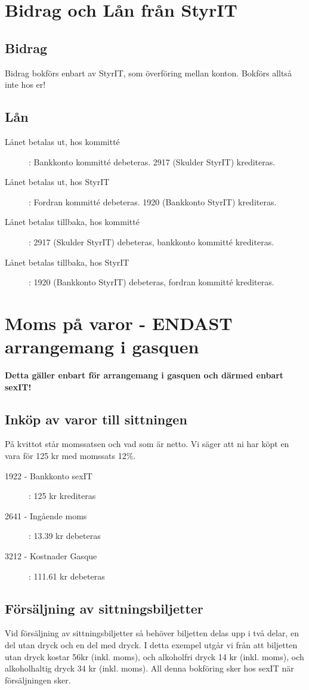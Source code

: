 \documentclass{article}
\begin{document}
\section{Bidrag och Lån från StyrIT}
\subsection{Bidrag}
Bidrag bokförs enbart av StyrIT, som överföring mellan konton. Bokförs alltså inte hos er! 
\subsection{Lån}
\begin{description}
    \item [Lånet betalas ut, hos kommitté]: Bankkonto kommitté debeteras. 2917 (Skulder StyrIT) krediteras. 
    \item [Lånet betalas ut, hos StyrIT]: Fordran kommitté debeteras. 1920 (Bankkonto StyrIT) krediteras.
    \item [Lånet betalas tillbaka, hos kommitté]: 2917 (Skulder StyrIT) debeteras, bankkonto kommitté krediteras.
    \item [Lånet betalas tillbaka, hos StyrIT]: 1920 (Bankkonto StyrIT) debeteras, fordran kommitté krediteras.
\end{description}

\section{Moms på varor - ENDAST arrangemang i gasquen}
\textbf{Detta gäller enbart för arrangemang i gasquen och därmed enbart sexIT!}
\subsection{Inköp av varor till sittningen}
På kvittot står momssatsen och vad som är netto. Vi säger att ni har köpt en vara för 125 kr med momssats 12\%. 
\begin{description}
    \item [1922 - Bankkonto sexIT ]: 125 kr krediteras
    \item [2641 - Ingående moms]: 13.39 kr debeteras
    \item [3212 - Kostnader Gasque]: 111.61 kr debeteras
\end{description}

\subsection{Försäljning av sittningsbiljetter}
Vid försäljning av sittningsbiljetter så behöver biljetten delas upp i två delar, en del utan dryck och en del med dryck. I detta exempel utgår vi från att biljetten utan dryck kostar 56kr (inkl. moms), och alkoholfri dryck 14 kr (inkl. moms), och alkoholhaltig dryck 34 kr (inkl. moms). All denna bokföring sker hos sexIT när försäljningen sker.
\end{document}
